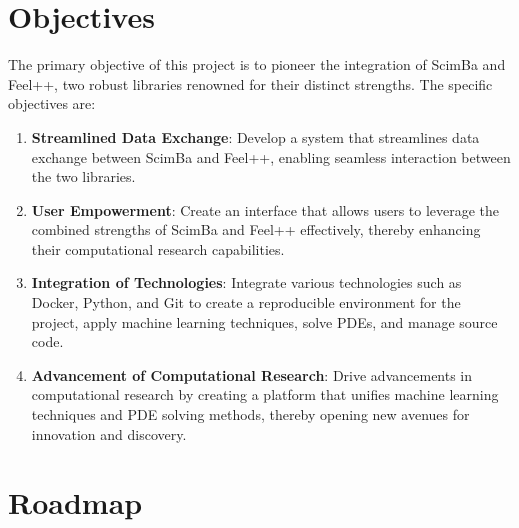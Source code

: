 \documentclass[12pt]{article}
\begin{document}
\section{Objectives}

The primary objective of this project is to pioneer the integration of ScimBa and Feel++, two robust libraries renowned for their distinct strengths. The specific objectives are:

\begin{enumerate}
    \item \textbf{Streamlined Data Exchange}: Develop a system that streamlines data exchange between ScimBa and Feel++, enabling seamless interaction between the two libraries.
    
    \item \textbf{User Empowerment}: Create an interface that allows users to leverage the combined strengths of ScimBa and Feel++ effectively, thereby enhancing their computational research capabilities.
    
    \item \textbf{Integration of Technologies}: Integrate various technologies such as Docker, Python, and Git to create a reproducible environment for the project, apply machine learning techniques, solve PDEs, and manage source code.
    
    \item \textbf{Advancement of Computational Research}: Drive advancements in computational research by creating a platform that unifies machine learning techniques and PDE solving methods, thereby opening new avenues for innovation and discovery.
\end{enumerate}



\newpage
\section{Roadmap}
\end{document}
